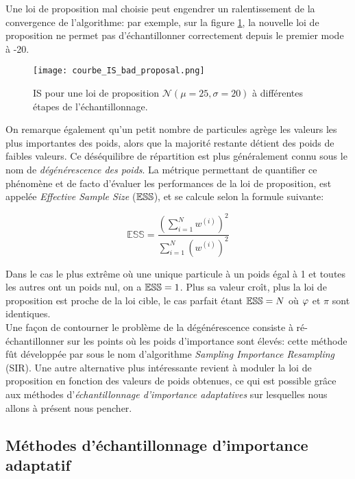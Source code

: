 {Une loi de proposition mal choisie peut engendrer un ralentissement de la convergence de l'algorithme: par exemple, }sur la figure \ref{courbe_IS_bad_proposal}, la nouvelle loi de proposition ne permet pas d'échantillonner correctement depuis le premier mode à -20.

\begin{figure}[h!]
	\centering
	\texttt{[image: courbe\_IS\_bad\_proposal.png]}
	\caption{IS pour une loi de proposition $\mathcal{N}(\mu=25, \sigma=20)$ à différentes étapes de l'échantillonnage.}
	\label{courbe_IS_bad_proposal}
\end{figure}

 On remarque également qu'un petit nombre de particules agrège les valeurs les plus importantes des poids, alors que la majorité restante détient des poids de faibles valeurs. Ce déséquilibre de répartition est plus généralement connu sous le nom de \textit{dégénérescence des poids}. La métrique permettant de quantifier ce phénomène et de facto d'évaluer les performances de la loi de proposition, est appelée \textit{Effective Sample Size} (${\mathbb{ESS}}$), et se calcule selon la formule suivante:

\begin{equation}
	\mathbb{ESS} = \dfrac{\left(\sum\limits_{i=1}^N w^{(i)}\right)^2}{\sum\limits_{i=1}^N \left(w^{(i)}\right)^2}
	\label{eq_def_ESS}
\end{equation}

Dans le cas le plus extrême où une unique particule à un poids égal à 1 et toutes les autres ont un poids nul, on a ${\mathbb{ESS}} = 1$. Plus sa valeur croît, plus la loi de proposition est proche de la loi cible, le cas parfait étant ${\mathbb{ESS}} = N$ où ${\varphi}$ et $\pi$ sont identiques.\\

Une façon de contourner le problème de la dégénérescence consiste à ré-échantillonner sur les points où les poids d'importance sont élevés: cette méthode fût développée par \cite{Rubin1988} sous le nom d'algorithme \textit{Sampling Importance Resampling} (SIR). Une autre alternative {plus intéressante} revient à moduler la loi de proposition en fonction des valeurs de poids obtenues, ce qui est possible grâce aux méthodes d'\textit{échantillonnage d'importance adaptatives} sur lesquelles nous allons à présent nous pencher.\\

\subsection{Méthodes d'échantillonnage d'importance adaptatif}


